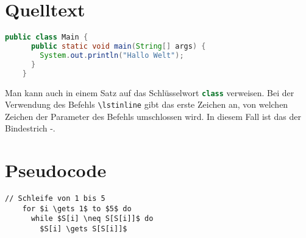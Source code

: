 \documentclass{scrartcl}
\begin{document}
  \section{Quelltext}

  \begin{lstlisting}[gobble=4,language=Java]
    public class Main {
      public static void main(String[] args) {
        System.out.println("Hallo Welt");
      }
    }
  \end{lstlisting}

  Man kann auch in einem Satz auf das Schlüsselwort \lstinline[language=Java]-class-
  verweisen. Bei der Verwendung des Befehls \lstinline-\lstinline- gibt das erste
  Zeichen an, von welchen Zeichen der Parameter des Befehls umschlossen wird.
  In diesem Fall ist das der Bindestrich -.

  \section{Pseudocode}

  \begin{lstlisting}[style=pseudo,gobble=4]
    // Schleife von 1 bis 5
    for $i \gets 1$ to $5$ do
      while $S[i] \neq S[S[i]]$ do
        $S[i] \gets S[S[i]]$
  \end{lstlisting}
\end{document}
